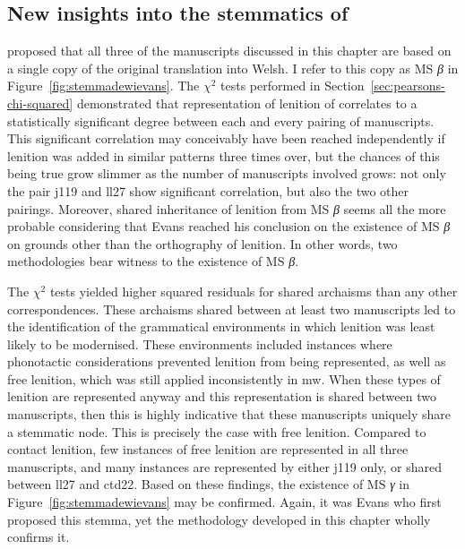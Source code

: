 \subsection{New insights into the stemmatics of }
\label{sec:new-insights-into}

\Textcite[lviii]{Eva_Welsh88} proposed that all three of the manuscripts discussed in this chapter are based on a single copy of the original translation into Welsh. I refer to this copy as MS \textit{β} in Figure~\ref{fig:stemmadewievans}. The \(\chi^2\) tests performed in Section~\ref{sec:pearsons-chi-squared} demonstrated that representation of lenition of  correlates to a statistically significant degree between each and every pairing of manuscripts. This significant correlation may conceivably have been reached independently if lenition was added in similar patterns three times over, but the chances of this being true grow slimmer as the number of manuscripts involved grows: not only the pair \gls{j119} and \gls{ll27} show significant correlation, but also the two other pairings. Moreover, shared inheritance of lenition from MS \textit{β} seems all the more probable considering that Evans reached his conclusion on the existence of MS \textit{β} on grounds other than the orthography of lenition. In other words,  two methodologies  bear witness to the existence of MS \textit{β}. 

The \(\chi^2\) tests yielded higher squared residuals for shared archaisms than any other correspondences. These archaisms shared between at least two manuscripts led to the identification of the grammatical environments in which lenition was least likely to be modernised. These environments included instances where phonotactic considerations prevented lenition from being represented, as well as free lenition, which was still applied inconsistently in \gls{mw}. When these types of lenition are represented anyway and this representation is shared between two manuscripts, then this is highly indicative that these manuscripts uniquely share a stemmatic node. This is precisely the case with free lenition. Compared to contact lenition, few instances of free lenition are represented in all three manuscripts, and many instances are represented by either \gls{j119} only, or shared between \gls{ll27} and \gls{ctd22}. Based on these findings, the existence of MS \textit{γ} in Figure~\ref{fig:stemmadewievans} may be confirmed. Again, it was Evans who first proposed this stemma, yet the methodology developed in this chapter wholly confirms it.

